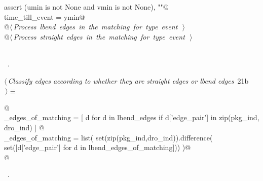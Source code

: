 \documentclass[10pt, english, oneside]{report}
\begin{document}
\begin{flushleft}
\begin{minipage}{\linewidth}
\begin{list}{}{}
\mbox{}\verb@    assert (umin is not None and vmin is not None), ""@\\
\mbox{}\verb@    time_till_event = ymin@\\
\mbox{}\verb@    @\hbox{$\langle\,${\itshape Process lbend edges in the matching for type  event}\nobreak\ {\footnotesize {}}$\,\rangle$}\verb@@\\
\mbox{}\verb@    @\hbox{$\langle\,${\itshape Process straight edges in the matching for type  event}\nobreak\ {\footnotesize {}}$\,\rangle$}\verb@@\\
\mbox{}\verb@return@\\
\mbox{}\verb@@{\NWsep}
\end{list}
\vspace{-1.5ex}
\footnotesize
\begin{list}{}{\setlength{\itemsep}{-\parsep}\setlength{\itemindent}{-\leftmargin}}
\item \NWtxtMacroRefIn\ .

\item{}
\end{list}
\end{minipage}\vspace{4ex}
\end{flushleft}


\begin{flushleft} \small
\begin{minipage}{\linewidth}\label{scrap22}\raggedright\small
{} $\langle\,${\itshape Classify edges according to whether they are straight edges or lbend edges}\nobreak\ {\footnotesize {21b}}$\,\rangle\equiv$
\vspace{-1ex}
\begin{list}{}{} \item
\mbox{}\verb@ @\\
\mbox{}\verb@lbend_edges_of_matching    = [ d for d in lbend_edges if d['edge_pair'] in zip(pkg_ind, dro_ind) ] @\\
\mbox{}\verb@straight_edges_of_matching = list(  set(zip(pkg_ind,dro_ind)).difference(\@\\
\mbox{}\verb@                                                set([d['edge_pair'] for d in lbend_edges_of_matching]))   )@\\
\mbox{}\verb@ @\\
\mbox{}\verb@@{\NWsep}
\end{list}
\vspace{-1.5ex}
\footnotesize
\begin{list}{}{\setlength{\itemsep}{-\parsep}\setlength{\itemindent}{-\leftmargin}}
\item \NWtxtMacroRefIn\ .

\item{}
\end{list}
\end{minipage}\vspace{4ex}
\end{flushleft}
\end{document}
